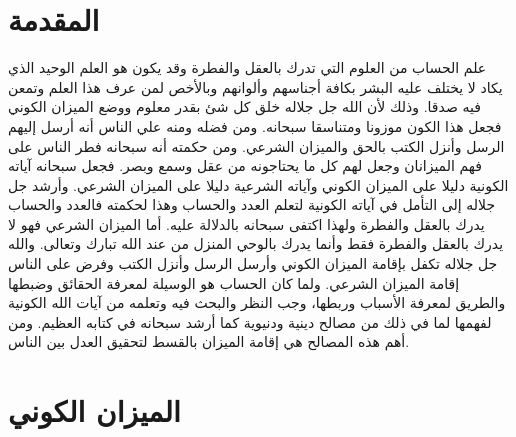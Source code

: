 \section{المقدمة}

علم الحساب من العلوم التي تدرك بالعقل والفطرة وقد يكون هو العلم الوحيد الذي يكاد لا يختلف عليه البشر بكافة أجناسهم وألوانهم وبالأخص لمن عرف هذا العلم وتمعن فيه صدقا. وذلك لأن الله جل جلاله خلق كل شئ بقدر معلوم ووضع الميزان الكوني فجعل هذا الكون موزونا ومتناسقا سبحانه. ومن فضله ومنه علي الناس أنه أرسل إليهم الرسل وأنزل الكتب بالحق والميزان الشرعي. ومن حكمته أنه سبحانه فطر الناس على فهم الميزانان وجعل لهم كل ما يحتاجونه من عقل وسمع وبصر. فجعل سبحانه آياته الكونية دليلا على الميزان الكوني وآياته الشرعية دليلا على الميزان الشرعي. وأرشد جل جلاله إلى التأمل في آياته الكونية لتعلم العدد والحساب وهذا لحكمته فالعدد والحساب يدرك بالعقل والفطرة ولهذا اكتفى سبحانه بالدلالة عليه. أما الميزان الشرعي فهو لا يدرك بالعقل والفطرة فقط وأنما يدرك بالوحي المنزل من عند الله تبارك وتعالى. والله جل جلاله تكفل بإقامة الميزان الكوني وأرسل الرسل وأنزل الكتب وفرض على الناس إقامة الميزان الشرعي. ولما كان الحساب هو الوسيلة لمعرفة الحقائق وضبطها والطريق لمعرفة الأسباب وربطها، وجب النظر والبحث فيه وتعلمه من آيات الله الكونية لفهمها لما في ذلك من مصالح دينية ودنيوية كما أرشد سبحانه في  كتابه العظيم. ومن أهم هذه المصالح هي إقامة الميزان بالقسط لتحقيق العدل بين الناس. 

\section{الميزان الكوني}

